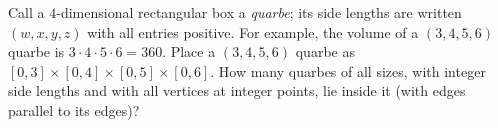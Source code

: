 Call a $4$-dimensional rectangular box a \emph{quarbe}; its side lengths are written $(w,x,y,z)$ with all entries positive. For example, the volume of a $(3,4,5,6)$ quarbe is $3\cdot4\cdot5\cdot6=360$. Place a $(3,4,5,6)$ quarbe as $[0,3]\times[0,4]\times[0,5]\times[0,6]$. How many quarbes of all sizes, with integer side lengths and with all vertices at integer points, lie inside it (with edges parallel to its edges)?
